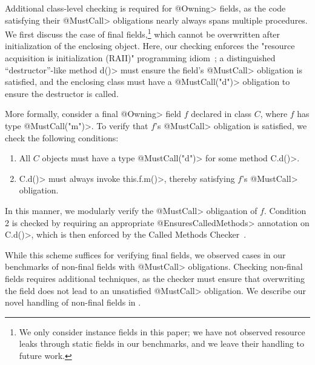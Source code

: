   Additional class-level checking is required for \<@Owning> fields, as the code
  satisfying their \<@MustCall> obligations nearly always spans multiple
  procedures.  We first discuss the case of final fields,\footnote{We only
  consider instance fields in this paper; we have not observed resource leaks
  through static fields in our benchmarks, and we leave their handling to future
  work.} which cannot be overwritten after initialization of the enclosing
  object.  Here, our checking enforces the "resource acquisition is
  initialization (RAII)" programming idiom~\cite{raii}; a distinguished
  ``destructor''-like method \<d()> must ensure the field's \<@MustCall> obligation is
  satisfied, and the enclosing class must have a \<@MustCall("d")> obligation to
  ensure the destructor is called.

  More formally, consider a final \<@Owning> field $f$ declared in class $C$,
  where
  $f$ has type \<@MustCall("m")>.  To
  verify that $f$'s \<@MustCall> obligation is satisfied, we check the following
  conditions:
  \begin{enumerate}
    \item All $C$ objects must have a type \<@MustCall("d")> for some method \<C.d()>.
    \item \<C.d()> must always invoke \<this.f.m()>, thereby satisfying $f$'s
    \<@MustCall> obligation.
  \end{enumerate}
  In this manner, we modularly verify the \<@MustCall> obligaation of $f$.  Condition 2 is
  checked by requiring an appropriate \<@EnsuresCalledMethods> annotation on
  \<C.d()>, which is then enforced by the Called Methods
  Checker~\cite{KelloggRSSE2020}.   

  While this scheme suffices for verifying final fields, we observed cases
  in our benchmarks of non-final fields with \<@MustCall> obligations.  Checking
  non-final fields requires additional techniques, as the checker must ensure
  that overwriting the field does not lead to an unsatisfied \<@MustCall> obligation.  We
  describe our novel handling of non-final fields in .


